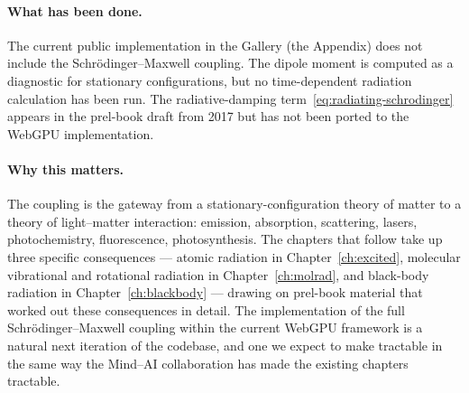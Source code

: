 \paragraph{What has been done.}
The current public implementation in the Gallery (the Appendix) does not include the Schr\"odinger--Maxwell coupling. The dipole moment is computed as a diagnostic for stationary configurations, but no time-dependent radiation calculation has been run. The radiative-damping term~\eqref{eq:radiating-schrodinger} appears in the prel-book draft from 2017 but has not been ported to the WebGPU implementation.

\paragraph{Why this matters.}
The coupling is the gateway from a stationary-configuration theory of matter to a theory of light--matter interaction: emission, absorption, scattering, lasers, photochemistry, fluorescence, photosynthesis. The chapters that follow take up three specific consequences --- atomic radiation in Chapter~\ref{ch:excited}, molecular vibrational and rotational radiation in Chapter~\ref{ch:molrad}, and black-body radiation in Chapter~\ref{ch:blackbody} --- drawing on prel-book material that worked out these consequences in detail. The implementation of the full Schr\"odinger--Maxwell coupling within the current WebGPU framework is a natural next iteration of the codebase, and one we expect to make tractable in the same way the Mind--AI collaboration has made the existing chapters tractable.

